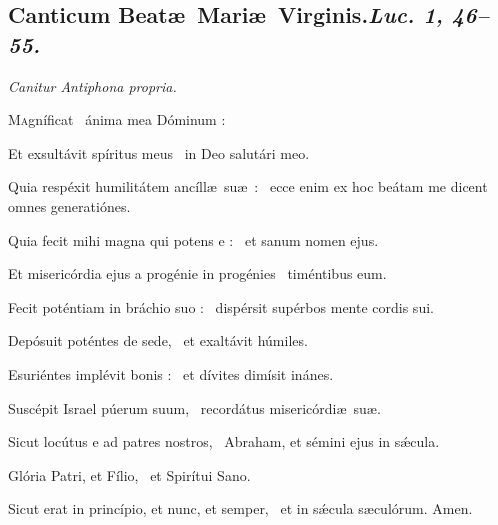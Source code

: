 \documentclass[12pt]{article} %
\newenvironment{psalmtext}{\leftskip 0.25in}{\vspace{1 mm}}
\newenvironment{rubric}{\vspace{1 mm}\color{benred8} \itshape \leftskip 0in \setlength{\parindent}{0.25in}}{\vspace{1 mm}}
\let\oldgresixstar\gresixstar
\renewcommand{\gresixstar}{\textcolor{benred8}{\oldgresixstar}}
\let\oldgrealtcross\grealtcross
\renewcommand{\grealtcross}{\textcolor{benred8}{\oldgrealtcross}}
\def\capitulumSpace{\hspace{20 mm}}
\begin{document}
\begin{pages}
\begin{Leftside}
\beginnumbering\pstart


\subsection*{Canticum Beat\ae\ Mari\ae\ Virginis.\capitulumSpace \emph{Luc. 1, 46--55.}}

\pend\pstart

\begin{rubric}
Canitur Antiphona propria.

\end{rubric}

\pend\pstart

\begin{psalmtext}
\lettrine[lhang=0.70]{M}{a}gn\'{i}ficat \grealtcross\ \'{a}nima mea D\'{o}minum :

\hspace*{9.5 mm}Et exsult\'{a}vit sp\'{i}ritus meus \gresixstar\ in Deo salut\'{a}ri meo.

Quia resp\'{e}xit humilit\'{a}tem anc\'{i}ll\ae\ su\ae\ : \gresixstar\ ecce enim ex hoc be\'{a}tam me dicent omnes generati\'{o}nes.

Quia fecit mihi magna qui potens e : \gresixstar\ et sanum nomen ejus.

Et miseric\'{o}rdia ejus a prog\'{e}nie in prog\'{e}nies \gresixstar\ tim\'{e}ntibus eum.

Fecit pot\'{e}ntiam in br\'{a}chio suo : \gresixstar\ disp\'{e}rsit sup\'{e}rbos mente cordis sui.

Dep\'{o}suit pot\'{e}ntes de sede, \gresixstar\ et exalt\'{a}vit h\'{u}miles.

Esuri\'{e}ntes impl\'{e}vit bonis : \gresixstar\ et d\'{i}vites dim\'{i}sit in\'{a}nes.

Susc\'{e}pit Israel p\'{u}erum suum, \gresixstar\ record\'{a}tus miseric\'{o}rdi\ae\ su\ae.

Sicut loc\'{u}tus e ad patres nostros, \gresixstar\ Abraham, et s\'{e}mini ejus in s\'{\ae}cula.

Glória Patri, et Fílio, \gresixstar\ et Spirítui Sano.

Sicut erat in princípio, et nunc, et semper, \gresixstar\ et in sǽcula sæculórum. Amen.


\end{psalmtext}
\end{Leftside}
\end{pages}
\end{document}
